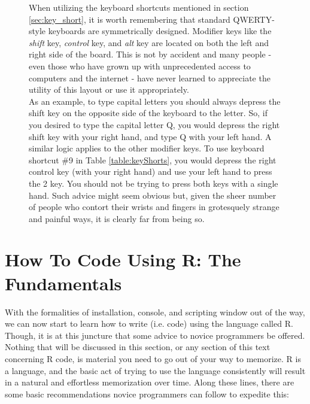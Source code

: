 \begin{figure}[!b]
    \centering
\begin{mdframed}[style = miscFrame, frametitle = Box 1.1: Are you using your keyboard properly?]

When utilizing the keyboard shortcuts mentioned in section \ref{sec:key_short}, it is worth remembering that standard QWERTY-style keyboards are symmetrically designed. Modifier keys like the \textit{shift} key, \textit{control} key, and \textit{alt} key are located on both the left and right side of the board.  This is not by accident and many people - even those who have grown up with unprecedented access to computers and the internet - have never learned to appreciate the utility of this layout or use it appropriately. \\

As an example, to type capital letters you should always depress the shift key on the opposite side of the keyboard to the letter. So, if you desired to type the capital letter Q, you would depress the right shift key with your right hand, and type Q with your left hand.  A similar logic applies to the other modifier keys. To use keyboard shortcut \#9 in Table \ref{table:keyShorts}, you would depress the right control key (with your right hand) and use your left hand to press the 2 key.  You should not be trying to press both keys with a single hand.  Such advice might seem obvious but, given the sheer number of people who contort their wrists and fingers in grotesquely strange and painful ways, it is clearly far from being so.

\end{mdframed}
\end{figure}


\section{How To Code Using R: The Fundamentals}

With the formalities of installation, console, and scripting window out of the way, we can now start to learn how to write (i.e. code) using the language called R.  Though, it is at this juncture that some advice to novice programmers be offered.  Nothing that will be discussed in this section, or any section of this text concerning R code, is material you need to go out of your way to memorize.  R is a language, and the basic act of trying to use the language consistently will result in a natural and effortless memorization over time. Along these lines, there are some basic recommendations novice programmers can follow to expedite this:

